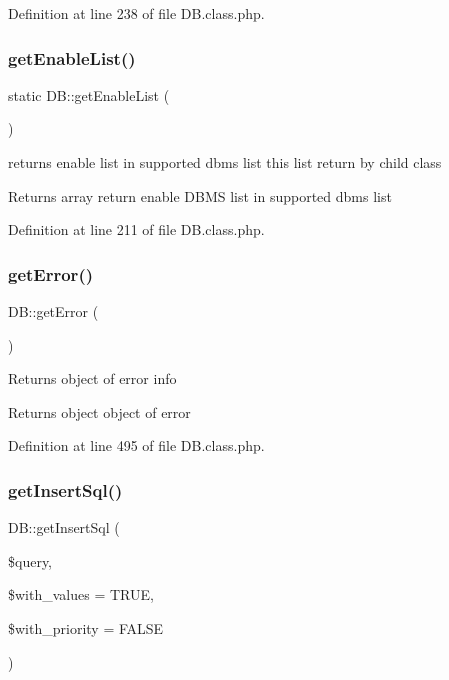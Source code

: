 Definition at line 238 of file D\+B.\+class.\+php.

\mbox{\label{classDB_af0a19b274727d2230af068eec4877664}} 
\subsubsection{\texorpdfstring{get\+Enable\+List()}{getEnableList()}}
{\footnotesize\ttfamily static D\+B\+::get\+Enable\+List (\begin{DoxyParamCaption}{ }\end{DoxyParamCaption})\hspace{0.3cm}{\ttfamily [static]}}

returns enable list in supported dbms list this list return by child class \begin{DoxyReturn}{Returns}
array return enable D\+B\+MS list in supported dbms list 
\end{DoxyReturn}


Definition at line 211 of file D\+B.\+class.\+php.

\mbox{\label{classDB_a3956fe8725f824d8c0a4f3cba449d6df}} 
\subsubsection{\texorpdfstring{get\+Error()}{getError()}}
{\footnotesize\ttfamily D\+B\+::get\+Error (\begin{DoxyParamCaption}{ }\end{DoxyParamCaption})}

Returns object of error info \begin{DoxyReturn}{Returns}
object object of error 
\end{DoxyReturn}


Definition at line 495 of file D\+B.\+class.\+php.

\mbox{\label{classDB_a2664c0b5ba2bc70d02504ebf343e913e}} 
\subsubsection{\texorpdfstring{get\+Insert\+Sql()}{getInsertSql()}}
{\footnotesize\ttfamily D\+B\+::get\+Insert\+Sql (\begin{DoxyParamCaption}\item[{}]{\$query,  }\item[{}]{\$with\+\_\+values = {\ttfamily TRUE},  }\item[{}]{\$with\+\_\+priority = {\ttfamily FALSE} }\end{DoxyParamCaption})}

